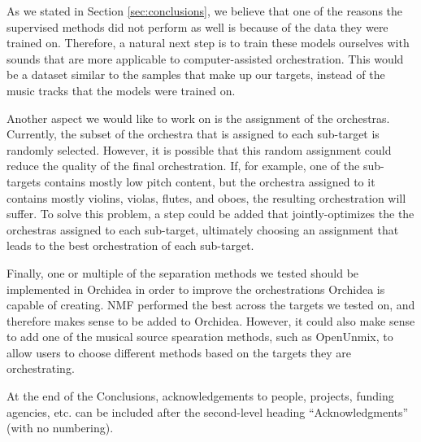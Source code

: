 \documentclass{article}
\begin{document}
	As we stated in Section \ref{sec:conclusions}, we believe that one of the reasons the supervised methods did not perform as well is because of the data they were trained on. Therefore, a natural next step is to train these models ourselves with sounds that are more applicable to computer-assisted orchestration. This would be a dataset similar to the samples that make up our targets, instead of the music tracks that the models were trained on.
	
	Another aspect we would like to work on is the assignment of the orchestras. Currently, the subset of the orchestra that is assigned to each sub-target is randomly selected. However, it is possible that this random assignment could reduce the quality of the final orchestration. If, for example, one of the sub-targets contains mostly low pitch content, but the orchestra assigned to it contains mostly violins, violas, flutes, and oboes, the resulting orchestration will suffer. To solve this problem, a step could be added that jointly-optimizes the the orchestras assigned to each sub-target, ultimately choosing an assignment that leads to the best orchestration of each sub-target.
	
	Finally, one or multiple of the separation methods we tested should be implemented in Orchidea in order to improve the orchestrations Orchidea is capable of creating. NMF performed the best across the targets we tested on, and therefore makes sense to be added to Orchidea. However, it could also make sense to add one of the musical source spearation methods, such as OpenUnmix, to allow users to choose different methods based on the targets they are orchestrating.
	
	\begin{acknowledgments}
		At the end of the Conclusions, acknowledgements to people, projects, funding agencies, etc. can be included after the second-level heading  ``Acknowledgments'' (with no numbering).
	\end{acknowledgments} 
	
	
	
\end{document}
